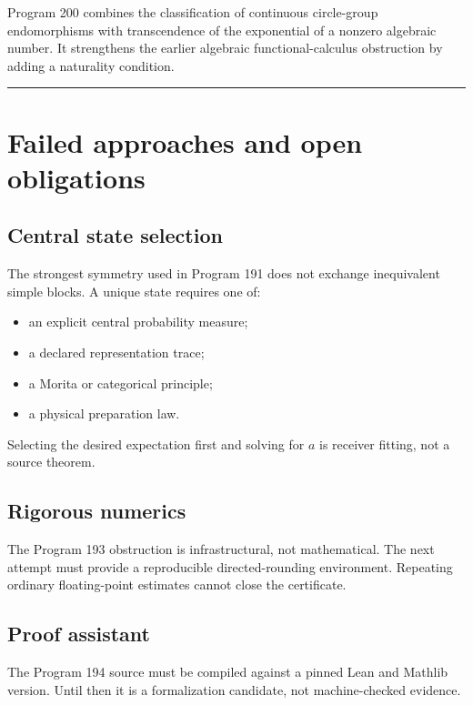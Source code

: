 \documentclass[11pt,a4paper,openany]{report}
\begin{document}
Program 200 combines the classification of continuous circle-group endomorphisms with transcendence of the exponential of a nonzero algebraic number. It strengthens the earlier algebraic functional-calculus obstruction by adding a naturality condition.

\par\medskip\hrule\medskip

\chapter{Failed approaches and open obligations}

\section{Central state selection}

The strongest symmetry used in Program 191 does not exchange inequivalent simple blocks. A unique state requires one of:

\begin{itemize}
\item 
an explicit central probability measure;

\item 
a declared representation trace;

\item 
a Morita or categorical principle;

\item 
a physical preparation law.

\end{itemize}

Selecting the desired expectation first and solving for \(a\) is receiver fitting, not a source theorem.

\section{Rigorous numerics}

The Program 193 obstruction is infrastructural, not mathematical. The next attempt must provide a reproducible directed-rounding environment. Repeating ordinary floating-point estimates cannot close the certificate.

\section{Proof assistant}

The Program 194 source must be compiled against a pinned Lean and Mathlib version. Until then it is a formalization candidate, not machine-checked evidence.
\end{document}

